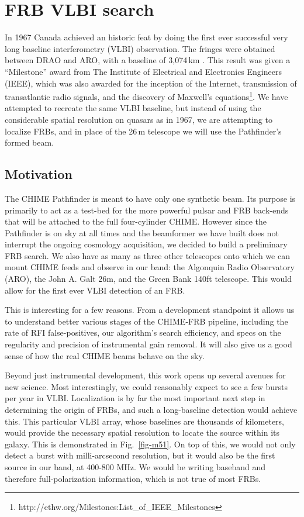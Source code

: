 \section{FRB VLBI search}
\label{vlbi_frb}

In 1967 Canada achieved an historic feat by doing 
the first ever successful very long 
baseline interferometry (VLBI) observation. The fringes were 
obtained between DRAO and ARO, with a baseline of 3,074\,km 
\citep{1967Natur.215...38B}. 
This result was given a ``Milestone'' award from 
The Institute of Electrical and Electronics Engineers (IEEE), 
which was also awarded for the inception of the Internet, transmission 
of transatlantic radio signals, and the discovery of Maxwell's 
equations\footnote{http://ethw.org/Milestones:List\_of\_IEEE\_Milestones}. 
We have attempted to recreate the same VLBI baseline, but instead of 
using the considerable spatial resolution on quasars as in 1967, 
we are attempting to localize FRBs, and in place of the 
26\,m telescope we will use the Pathfinder's formed beam.


\subsection{Motivation}

The CHIME Pathfinder is meant to have only one synthetic beam. 
Its purpose is primarily to act as a test-bed for the more powerful 
pulsar and FRB back-ends that will be attached to the 
full four-cylinder CHIME. However since the Pathfinder is on 
sky at all times and the beamformer we have built does not 
interrupt the ongoing cosmology acquisition, we decided to 
build a preliminary FRB search. We also have as many as three 
other telescopes onto which we can mount 
CHIME feeds and observe in our band: the Algonquin Radio Observatory (ARO), 
the John A. Galt 26m, and the Green Bank 140ft telescope. This would
allow for the first ever VLBI detection of an FRB. 

This is interesting for a few reasons. From a development 
standpoint it allows us to understand better various stages of the 
CHIME-FRB pipeline, including the rate of 
RFI false-positives, our algorithm's search 
efficiency, and specs on the regularity and precision of instrumental 
gain removal. It will also give us a good sense of how the real CHIME 
beams behave on the sky. 

Beyond just instrumental development, this work
opens up several avenues for new science. 
Most interestingly, 
we could reasonably expect to see a few bursts per year in 
VLBI. Localization is by far the most 
important next step in determining the origin of FRBs, and 
such a long-baseline detection would achieve this. This particular VLBI 
array, whose baselines are thousands of kilometers, would provide 
the necessary spatial resolution to locate the source 
within its galaxy. This is demonstrated in Fig.~\ref{fig-m51}.
On top of this, we would not only detect a burst with 
milli-arcsecond resolution, but it would also be the first source 
in our band, at 400-800 MHz. We 
would be writing baseband and therefore full-polarization information,
which is not true of most FRBs.

